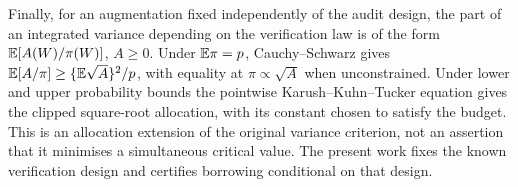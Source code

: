 Finally, for an augmentation fixed independently of the audit design, the part of an integrated variance depending on the verification law is of the form $\mathbb E[A(W)/\pi(W)]$, $A\geq0$. Under $\mathbb E\pi=p$, Cauchy--Schwarz gives
$\mathbb E[A/\pi]\geq\{\mathbb E\sqrt A\}^2/p$, with equality at $\pi\propto\sqrt A$ when unconstrained. Under lower and upper probability bounds the pointwise Karush--Kuhn--Tucker equation gives the clipped square-root allocation, with its constant chosen to satisfy the budget. This is an allocation extension of the original variance criterion, not an assertion that it minimises a simultaneous critical value. The present work fixes the known verification design and certifies borrowing conditional on that design.
